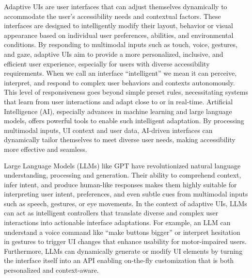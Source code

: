 Adaptive UIs are user interfaces that can adjust themselves dynamically to accommodate the user’s accessibility needs and contextual factors. These interfaces are designed to intelligently modify their layout, behavior or visual appearance based on individual user preferences, abilities, and environmental conditions. By responding to multimodal inputs such as touch, voice, gestures, and gaze, adaptive UIs aim to provide a more personalized, inclusive, and efficient user experience, especially for users with diverse accessibility requirements. When we call an interface “intelligent” we mean it can perceive, interpret, and respond to complex user behaviors and contexts autonomously. This level of responsiveness goes beyond simple preset rules, necessitating systems that learn from user interactions and adapt close to or in real-time. Artificial Intelligence (AI), especially advances in machine learning and large language models, offers powerful tools to enable such intelligent adaptation. By processing multimodal inputs, UI context and user data, AI-driven interfaces can dynamically tailor themselves to meet diverse user needs, making accessibility more effective and seamless.

Large Language Models (LLMs) like GPT have revolutionized natural language understanding, processing and generation. Their ability to comprehend context, infer intent, and produce human-like responses makes them highly suitable for interpreting user intent, preferences, and even subtle cues from multimodal inputs such as speech, gestures, or eye movements.
In the context of adaptive UIs, LLMs can act as intelligent controllers that translate diverse and complex user interactions into actionable interface adaptations. For example, an LLM can understand a voice command like “make buttons bigger” or interpret hesitation in gestures to trigger UI changes that enhance usability for motor-impaired users. Furthermore, LLMs can dynamically generate or modify UI elements by turning the interface itself into an API enabling on-the-fly customization that is both personalized and context-aware.

